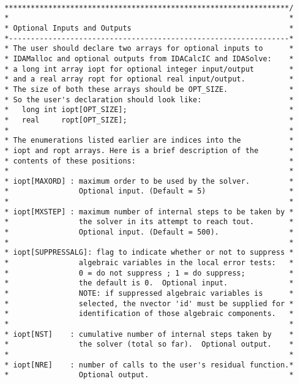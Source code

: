 \documentclass[11pt]{article}
\begin{document}
\small
\begin{verbatim}

 *****************************************************************/
 *                                                                *
 * Optional Inputs and Outputs                                    *
 *----------------------------------------------------------------*
 * The user should declare two arrays for optional inputs to      *
 * IDAMalloc and optional outputs from IDACalcIC and IDASolve:    *
 * a long int array iopt for optional integer input/output        *
 * and a real array ropt for optional real input/output.          *
 * The size of both these arrays should be OPT_SIZE.              *
 * So the user's declaration should look like:                    *
 *   long int iopt[OPT_SIZE];                                     *
 *   real     ropt[OPT_SIZE];                                     *
 *                                                                *
 * The enumerations listed earlier are indices into the           * 
 * iopt and ropt arrays. Here is a brief description of the       *
 * contents of these positions:                                   *
 *                                                                *
 * iopt[MAXORD] : maximum order to be used by the solver.         *
 *                Optional input. (Default = 5)                   *
 *                                                                *
 * iopt[MXSTEP] : maximum number of internal steps to be taken by *
 *                the solver in its attempt to reach tout.        *
 *                Optional input. (Default = 500).                *
 *                                                                *
 * iopt[SUPPRESSALG]: flag to indicate whether or not to suppress *
 *                algebraic variables in the local error tests:   *
 *                0 = do not suppress ; 1 = do suppress;          *
 *                the default is 0.  Optional input.              *      
 *                NOTE: if suppressed algebraic variables is      * 
 *                selected, the nvector 'id' must be supplied for *
 *                identification of those algebraic components.   *
 *                                                                *
 * iopt[NST]    : cumulative number of internal steps taken by    *
 *                the solver (total so far).  Optional output.    *
 *                                                                *
 * iopt[NRE]    : number of calls to the user's residual function.*
 *                Optional output.                                *

\end{verbatim}
\end{document}
